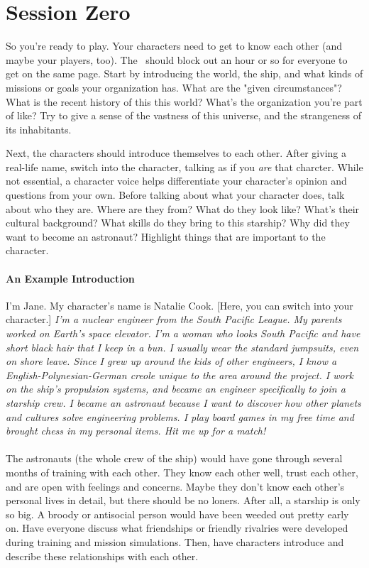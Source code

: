 \section{Session Zero}
\par
So you're ready to play. Your characters need to get to know each other (and maybe your players, too). The \gm\, should block out an hour or so for everyone to get on the same page. Start by introducing the world, the ship, and what kinds of missions or goals your organization has. What are the "given circumstances"? What is the recent history of this this world? What's the organization you're part of like? Try to give a sense of the vastness of this universe, and the strangeness of its inhabitants.

\par
Next, the characters should introduce themselves to each other. After giving a real-life name, switch into the character, talking as if you \textit{are} that charcter. While not essential, a character voice helps differentiate your character's opinion and questions from your own. Before talking about what your character does, talk about who they are. Where are they from? What do they look like? What's their cultural background? What skills do they bring to this starship? Why did they want to become an astronaut? Highlight things that are important to the character.

\paragraph{An Example Introduction}
I'm Jane. My character's name is Natalie Cook. [Here, you can switch into your character.] \textit{I'm a nuclear engineer from the South Pacific League. My parents worked on Earth's space elevator. I'm a woman who looks South Pacific and have short black hair that I keep in a bun. I usually wear the standard jumpsuits, even on shore leave. Since I grew up around the kids of other engineers, I know a English-Polynesian-German creole unique to the area around the project. I work on the ship's propulsion systems, and became an engineer specifically to join a starship crew. I became an astronaut because I want to discover how other planets and cultures solve engineering problems. I play board games in my free time and brought chess in my personal items. Hit me up for a match!}

\paragraph{}
The astronauts (the whole crew of the ship) would have gone through several months of training with each other. They know each other well, trust each other, and are open with feelings and concerns. Maybe they don't know each other's personal lives in detail, but there should be no loners. After all, a starship is only so big. A broody or antisocial person would have been weeded out pretty early on. Have everyone discuss what friendships or friendly rivalries were developed during training and mission simulations. Then, have characters introduce and describe these relationships with each other.

